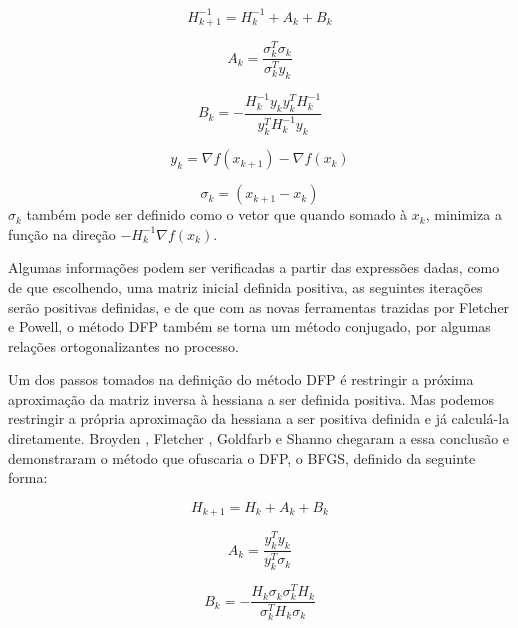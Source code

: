 \begin{equation}
H^{-1}_{k+1} = H^{-1}_{k} + A_k + B_k
\end{equation}

\begin{equation}
A_k =  \frac{\sigma_k^T \sigma_k}{\sigma_k^T y_k}
\end{equation}

\begin{equation}
B_k = - \frac{   H^{-1}_k y_k y^T_k  H^{-1}_k  }{ y^T_k H^{-1}_k y_k}
\end{equation}

\begin{equation}
y_k = \nabla f(x_{k+1}) - \nabla f(x_k)
\end{equation}

\begin{equation}
\sigma_k = (x_{k+1} - x_k)
\end{equation}
\(\sigma_k\) também pode ser definido como o vetor que quando somado à \(x_k\), minimiza a função
na direção \(-H^{-1}_k \nabla f(x_k)\).

Algumas informações podem ser verificadas a partir das expressões dadas, como de que escolhendo, uma
matriz inicial definida positiva, as seguintes iterações serão positivas definidas, e de que com
as novas ferramentas trazidas por Fletcher e Powell, o método DFP também se torna um método
conjugado, por algumas relações ortogonalizantes no processo.

Um dos passos tomados na definição do método DFP é restringir a próxima aproximação da matriz
inversa à hessiana a ser definida positiva. Mas podemos restringir a própria aproximação da
hessiana a ser positiva definida e já calculá-la diretamente. Broyden \cite{BROYDEN_1970},
Fletcher \cite{Fletcher_1970}, Goldfarb \cite{Goldfarb_1970} e Shanno \cite{Shanno_1970} chegaram a
essa conclusão e demonstraram o método que ofuscaria o DFP, o BFGS, definido da seguinte forma:


\begin{equation}
H_{k+1} = H_{k} + A_k + B_k
\end{equation}

\begin{equation}
A_k =  \frac{y_k^T y_k}{y_k^T \sigma_k}
\end{equation}

\begin{equation}
B_k = - \frac{   H_k \sigma_k \sigma^T_k  H_k  }{ \sigma^T_k H_k \sigma_k}
\end{equation}

